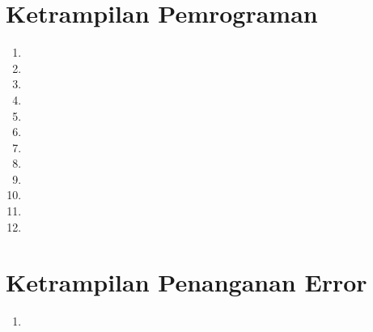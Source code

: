 \section{Ketrampilan Pemrograman}
\begin{enumerate}
\item
    
    
\item
    

\item
    
    
\item
    
    
\item
    
    
\item
    
    
\item 
    
    
\item
    

\item
    
    
\item 
    
    
\item
    

\item
    
    
\end{enumerate}


\section{Ketrampilan Penanganan Error}
\begin{enumerate}
\item

\end{enumerate}

